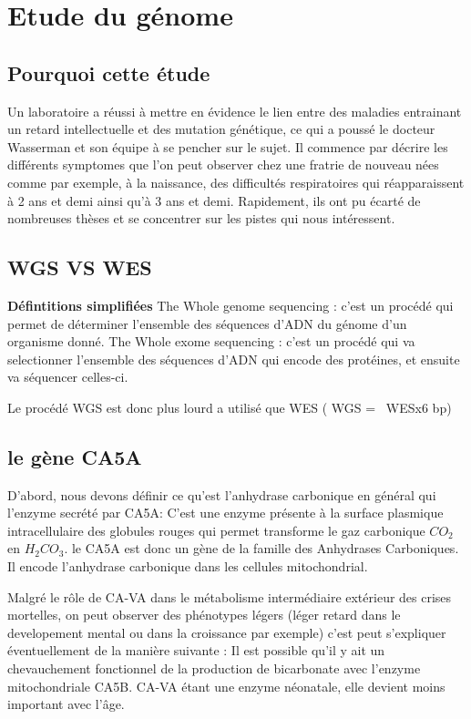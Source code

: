 \section{Etude du génome}

\subsection{Pourquoi cette étude}

Un laboratoire a réussi à mettre en évidence le lien entre des maladies entrainant un retard intellectuelle et des mutation génétique, ce qui a poussé le docteur Wasserman et son équipe à se pencher sur le sujet.
Il commence par décrire les différents symptomes que l'on peut observer chez une fratrie de nouveau nées comme par exemple, à la naissance, des difficultés respiratoires qui réapparaissent à 2 ans et demi ainsi qu'à 3 ans et demi.
Rapidement, ils ont pu écarté de nombreuses thèses et se concentrer sur les pistes qui nous intéressent.

\subsection{WGS VS WES}
\textbf{Défintitions simplifiées}
The Whole genome sequencing : c'est un procédé qui permet de déterminer l'ensemble des séquences d'ADN du génome d'un organisme donné.
The Whole exome sequencing : c'est un procédé qui va selectionner l'ensemble des séquences d'ADN qui encode des protéines, et ensuite va séquencer celles-ci.

Le procédé WGS est donc plus lourd a utilisé que WES ( WGS = ~WESx6 bp)

\subsection{le gène CA5A}
D'abord, nous devons définir ce qu'est l'anhydrase carbonique en général qui l'enzyme secrété par CA5A: 
C'est une enzyme présente à la surface plasmique intracellulaire des globules rouges qui permet transforme le gaz carbonique $CO_2$ en $H_2CO_3$.
le CA5A est donc un gène de la famille des Anhydrases Carboniques. Il encode l'anhydrase carbonique dans les cellules mitochondrial.

Malgré le rôle de CA-VA dans le métabolisme intermédiaire extérieur des crises mortelles, on peut observer des phénotypes légers (léger retard dans le developement mental ou dans la croissance par exemple)
c'est peut s'expliquer éventuellement de la manière suivante :
Il est possible qu'il y ait un chevauchement fonctionnel de la production de bicarbonate avec l'enzyme mitochondriale CA5B. CA-VA étant une enzyme néonatale, elle devient moins important avec l'âge.

